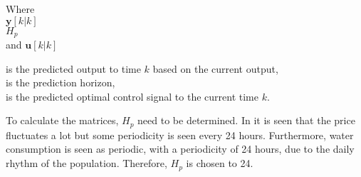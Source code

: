  \begin{minipage}[t]{0.20\textwidth}
 Where\\
 \hspace*{8mm} $\bm{y}[k|k]$ \\
 \hspace*{8mm} $H_p$ \\
 and \hspace*{0.7mm} $\bm{u}[k|k]$	
 \end{minipage}
 \begin{minipage}[t]{0.68\textwidth}
 \vspace*{2mm}
 is the predicted output to time $k$ based on the current output, \\
 is the prediction horizon,\\
 is the predicted optimal control signal to the current time $k$.
 \end{minipage}

To calculate the matrices, $H_p$ need to be determined. In  it is seen that the price fluctuates a lot but some periodicity is seen every 24 hours. Furthermore, water consumption is seen as periodic, with a periodicity of 24 hours, due to the daily rhythm of the population. Therefore, $H_p$ is chosen to 24. 





